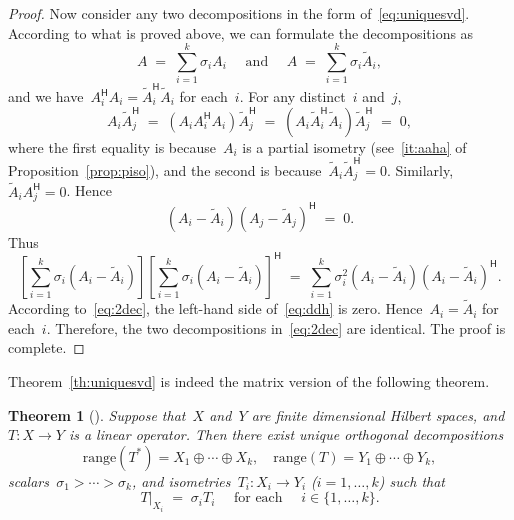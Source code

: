 \documentclass[11pt,a4paper]{article}  %
\numberwithin{equation}{section}
\newtheorem{theorem}{Theorem}%
\theoremstyle{definition}
\newcommand{\hmt}{{\scriptscriptstyle{{\mathsf{H}}}}}
\newcommand{\adj}{*}
\newcommand{\range}{\mathrm{range}}
\begin{document}
\begin{proof}
  Now consider any two decompositions in the form of~\eqref{eq:uniquesvd}. According to what is
  proved above, we can formulate the decompositions as
  \begin{equation}
    \label{eq:2dec}
    A \;=\; \sum_{i=1}^k \sigma_i A_i \quad \text{ and } \quad
    A\;=\;\sum_{i=1}^k \sigma_i \tilde{A}_i,
  \end{equation}
  and we have~$A_i^\hmt A_i= \tilde{A}_i^\hmt\tilde{A}_i$ for each~$i$.
  For any distinct~$i$ and~$j$,
  \begin{equation*}
    A_i\tilde{A}_j^\hmt \;=\; (A_iA_i^\hmt A_i)\tilde{A}_j^\hmt
    \;=\; (A_i\tilde{A}_i^\hmt \tilde{A}_i)\tilde{A}_j^\hmt \;=\; 0,
  \end{equation*}
  where the first equality is because~$A_i$ is a partial isometry (see~\ref{it:aaha} of
  Proposition~\ref{prop:piso}), and the second is because~$\tilde{A}_i\tilde{A}_j^\hmt = 0$.
  Similarly, $\tilde{A}_iA_j^\hmt = 0$. Hence
  \begin{equation*}
    (A_i-\tilde{A}_i)(A_j-\tilde{A}_j)^\hmt \;=\; 0.
  \end{equation*}
  Thus
  \begin{equation}
    \label{eq:ddh}
    \left[\sum_{i=1}^k \sigma_i(A_i-\tilde{A}_i) \right]
    \left[\sum_{i=1}^k \sigma_i(A_i-\tilde{A}_i) \right]^\hmt
    \;=\; \sum_{i=1}^k \sigma_i^2 (A_i-\tilde{A}_i)(A_i-\tilde{A}_i)^\hmt.
  \end{equation}
  According to~\eqref{eq:2dec}, the left-hand side of~\eqref{eq:ddh} is zero.
  Hence~$A_i=\tilde{A}_i$ for each~$i$. Therefore, the two decompositions in~\eqref{eq:2dec} are
  identical. The proof is complete.
\end{proof}

Theorem~\ref{th:uniquesvd} is indeed the matrix version of the following theorem.

\begin{theorem}[{\cite[Theorem~1]{Koranyi_2001}}]\label{th:orthodec}
  Suppose that~$X$ and~$Y$ are finite dimensional Hilbert spaces, and~$T\mathrel{:}X\to Y$ is a linear
  operator. Then there exist unique orthogonal decompositions
  \begin{equation*}
    \range(T^\adj) = X_1 \oplus \cdots \oplus X_k, \quad
    \range(T) = Y_1 \oplus \cdots \oplus Y_k,
  \end{equation*}
  scalars~$\sigma_1>\cdots >\sigma_k$, and isometries~$T_i\mathrel{:}X_i\to Y_i$ \textnormal{(}$i=1,
  \dots, k$\textnormal{)}
  such that
  \begin{equation*}
    T|_{X_i} \;=\; \sigma_i T_i
    \quad \text{ for each }\quad i\in\{1,\dots,k\}.
  \end{equation*}
\end{theorem}
\end{document}
